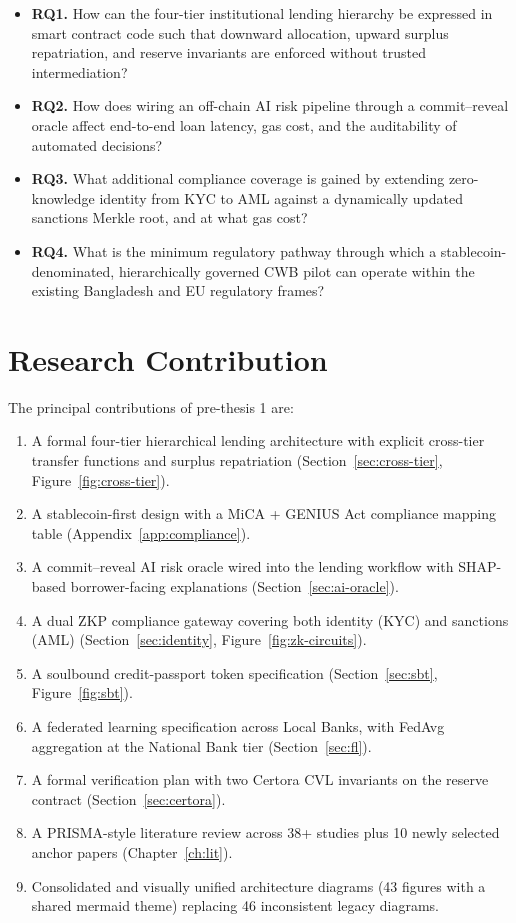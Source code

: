 \documentclass[12pt,a4paper]{report}
\begin{document}
\begin{itemize}[leftmargin=*,itemsep=2pt]
    \item \textbf{RQ1.} How can the four-tier institutional lending hierarchy be expressed in smart contract code such that downward allocation, upward surplus repatriation, and reserve invariants are enforced without trusted intermediation?
    \item \textbf{RQ2.} How does wiring an off-chain AI risk pipeline through a commit--reveal oracle affect end-to-end loan latency, gas cost, and the auditability of automated decisions?
    \item \textbf{RQ3.} What additional compliance coverage is gained by extending zero-knowledge identity from KYC to AML against a dynamically updated sanctions Merkle root, and at what gas cost?
    \item \textbf{RQ4.} What is the minimum regulatory pathway through which a stablecoin-denominated, hierarchically governed CWB pilot can operate within the existing Bangladesh and EU regulatory frames?
\end{itemize}

\section{Research Contribution}
\label{sec:contrib}

The principal contributions of pre-thesis 1 are:

\begin{enumerate}[leftmargin=*,itemsep=2pt]
    \item A formal four-tier hierarchical lending architecture with explicit cross-tier transfer functions and surplus repatriation (Section~\ref{sec:cross-tier}, Figure~\ref{fig:cross-tier}).
    \item A stablecoin-first design with a MiCA + GENIUS Act compliance mapping table (Appendix~\ref{app:compliance}).
    \item A commit--reveal AI risk oracle wired into the lending workflow with SHAP-based borrower-facing explanations (Section~\ref{sec:ai-oracle}).
    \item A dual ZKP compliance gateway covering both identity (KYC) and sanctions (AML) (Section~\ref{sec:identity}, Figure~\ref{fig:zk-circuits}).
    \item A soulbound credit-passport token specification (Section~\ref{sec:sbt}, Figure~\ref{fig:sbt}).
    \item A federated learning specification across Local Banks, with FedAvg aggregation at the National Bank tier (Section~\ref{sec:fl}).
    \item A formal verification plan with two Certora CVL invariants on the reserve contract (Section~\ref{sec:certora}).
    \item A PRISMA-style literature review across 38+ studies plus 10 newly selected anchor papers (Chapter~\ref{ch:lit}).
    \item Consolidated and visually unified architecture diagrams (43 figures with a shared mermaid theme) replacing 46 inconsistent legacy diagrams.
\end{enumerate}
\end{document}
